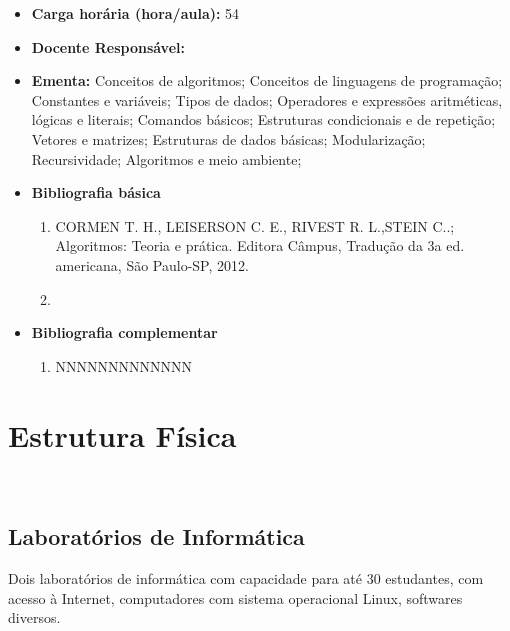 \documentclass[11pt,fleqn]{book} %
\begin{document}
\begin{itemize}
	\item \textbf{Carga horária (hora/aula):} 54
	\item \textbf{Docente Responsável:}~
	\item \textbf{Ementa:} 
	Conceitos de algoritmos;
	Conceitos de linguagens de programação;
	Constantes e variáveis;
	Tipos de dados;
	Operadores e expressões aritméticas, lógicas e literais; 
	Comandos básicos;
	Estruturas condicionais e de repetição;
	Vetores e matrizes;
	Estruturas de dados básicas;
	Modularização;
	Recursividade;
	Algoritmos e meio ambiente;
	\item \textbf{Bibliografia básica}
	\begin{enumerate}
		\item CORMEN T. H., LEISERSON C. E., RIVEST R. L.,STEIN C..; Algoritmos: Teoria e prática. Editora Câmpus, Tradução da 3a ed. americana, São Paulo-SP, 2012.
		\item 
	\end{enumerate}
	\item \textbf{Bibliografia complementar}
	\begin{enumerate}
		\item NNNNNNNNNNNNN
	\end{enumerate}	
\end{itemize}



\chapter{Estrutura Física}\label{estrutura}
\vspace{6em}
\begin{flushright}
	\textit{\textcolor{white}{Um bonita citação...}}
\end{flushright}
\vspace{12em}

\section{Laboratórios de Informática}
Dois laboratórios de informática com capacidade para até 30 estudantes, com acesso à Internet, computadores com sistema operacional Linux, softwares diversos.
\end{document}
